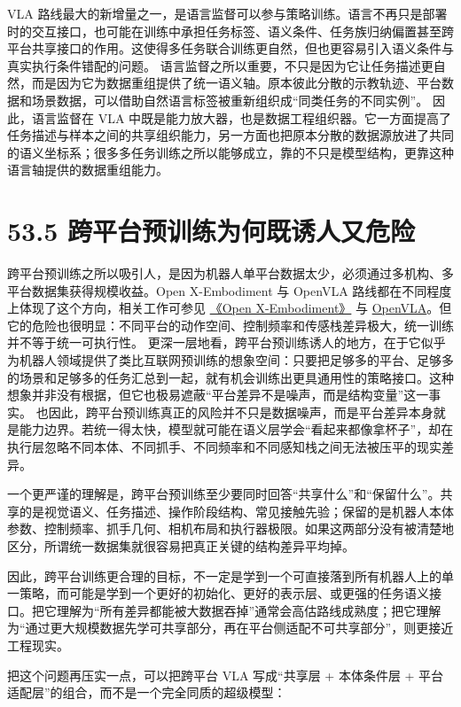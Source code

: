 VLA 路线最大的新增量之一，是语言监督可以参与策略训练。语言不再只是部署时的交互接口，也可能在训练中承担任务标签、语义条件、任务族归纳偏置甚至跨平台共享接口的作用。这使得多任务联合训练更自然，但也更容易引入语义条件与真实执行条件错配的问题。 语言监督之所以重要，不只是因为它让任务描述更自然，而是因为它为数据重组提供了统一语义轴。原本彼此分散的示教轨迹、平台数据和场景数据，可以借助自然语言标签被重新组织成“同类任务的不同实例”。 因此，语言监督在 VLA 中既是能力放大器，也是数据工程组织器。它一方面提高了任务描述与样本之间的共享组织能力，另一方面也把原本分散的数据源放进了共同的语义坐标系；很多多任务训练之所以能够成立，靠的不只是模型结构，更靠这种语言轴提供的数据重组能力。

\section*{53.5 跨平台预训练为何既诱人又危险}


跨平台预训练之所以吸引人，是因为机器人单平台数据太少，必须通过多机构、多平台数据集获得规模收益。Open X-Embodiment 与 OpenVLA 路线都在不同程度上体现了这个方向，相关工作可参见 \href{https://arxiv.org/abs/2310.08864}{《Open X-Embodiment》} 与 \href{https://arxiv.org/abs/2406.09246}{OpenVLA}。但它的危险也很明显：不同平台的动作空间、控制频率和传感栈差异极大，统一训练并不等于统一可执行性。 更深一层地看，跨平台预训练诱人的地方，在于它似乎为机器人领域提供了类比互联网预训练的想象空间：只要把足够多的平台、足够多的场景和足够多的任务汇总到一起，就有机会训练出更具通用性的策略接口。这种想象并非没有根据，但它也极易遮蔽“平台差异不是噪声，而是结构变量”这一事实。 也因此，跨平台预训练真正的风险并不只是数据噪声，而是平台差异本身就是能力边界。若统一得太快，模型就可能在语义层学会“看起来都像拿杯子”，却在执行层忽略不同本体、不同抓手、不同频率和不同感知栈之间无法被压平的现实差异。

一个更严谨的理解是，跨平台预训练至少要同时回答“共享什么”和“保留什么”。共享的是视觉语义、任务描述、操作阶段结构、常见接触先验；保留的是机器人本体参数、控制频率、抓手几何、相机布局和执行器极限。如果这两部分没有被清楚地区分，所谓统一数据集就很容易把真正关键的结构差异平均掉。

因此，跨平台训练更合理的目标，不一定是学到一个可直接落到所有机器人上的单一策略，而可能是学到一个更好的初始化、更好的表示层、或更强的任务语义接口。把它理解为“所有差异都能被大数据吞掉”通常会高估路线成熟度；把它理解为“通过更大规模数据先学可共享部分，再在平台侧适配不可共享部分”，则更接近工程现实。

把这个问题再压实一点，可以把跨平台 VLA 写成“共享层 + 本体条件层 + 平台适配层”的组合，而不是一个完全同质的超级模型：

